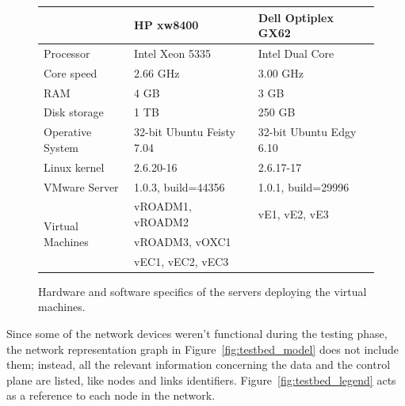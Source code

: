 \documentclass[10pt,a4paper]{report}
\begin{document}
\begin{figure}[!htbp]
  \begin{center}
    \begin{tabular}{|l|l|l|}
      \hline
      & \textbf{HP xw8400} & \textbf{Dell Optiplex GX62} \\ \hline
      Processor & Intel Xeon 5335 & Intel Dual Core\\ \hline
      Core speed & 2.66 GHz & 3.00 GHz \\ \hline
      RAM & 4 GB & 3 GB \\ \hline
      Disk storage & 1 TB & 250 GB \\ \hline
      Operative System & 32-bit Ubuntu Feisty 7.04 & 32-bit Ubuntu Edgy
      6.10 \\ \hline
      Linux kernel & 2.6.20-16 & 2.6.17-17 \\ \hline
      VMware Server & 1.0.3, build=44356 & 1.0.1, build=29996 \\ \hline
      \multirow{3}{*}{Virtual Machines} & vROADM1, vROADM2 & vE1, vE2,
      vE3 \\
      & vROADM3, vOXC1 & \\
      & vEC1, vEC2, vEC3 & \\ \hline
    \end{tabular}
    \caption[Virtual machines sever specifics]{Hardware and software
      specifics of the servers deploying the virtual machines.}
    \label{fig:testbed_vm}
  \end{center}
\end{figure}

Since some of the network devices weren't functional during the
testing phase, the network representation graph in
Figure~\ref{fig:testbed_model} does not include them; instead, all the
relevant information concerning the data and the control plane are
listed, like nodes and links
identifiers. Figure~\ref{fig:testbed_legend} acts as a reference to
each node in the network.
\end{document}
